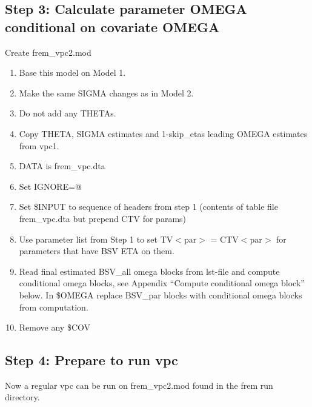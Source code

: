 \subsection{Step 3:  Calculate parameter OMEGA conditional on covariate OMEGA}
Create frem\_vpc2.mod
\begin{enumerate}
	\item Base this model on Model 1. %
    \item Make the same SIGMA changes as in Model 2.
    \item Do not add any THETAs.
    \item Copy THETA, SIGMA estimates and 1-skip\_etas leading OMEGA estimates from vpc1.
	\item DATA is frem\_vpc.dta
	\item Set IGNORE=@
	\item Set \$INPUT to sequence of headers from step 1 (contents of table file frem\_vpc.dta but prepend CTV for params)
	\item Use parameter list from Step 1 to set TV$<$par$>$ = CTV$<$par$>$ for
parameters that have BSV ETA %
on them.
	\item Read final estimated BSV\_all omega blocks from lst-file and compute conditional omega blocks,
    see Appendix “Compute conditional omega block” below. In \$OMEGA replace BSV\_par blocks with
    conditional omega blocks from computation.
    \item Remove any \$COV
\end{enumerate}

\subsection{Step 4: Prepare to run  vpc}
Now a regular vpc can be run on frem\_vpc2.mod found in the frem run directory.



